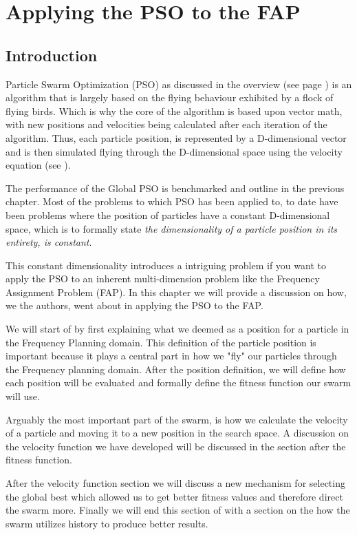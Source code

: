 \chapter{Applying the PSO to the FAP}
\label{chpt:psoapplicationFAP}
\section{Introduction}
Particle Swarm Optimization (PSO) as discussed in the overview (see page \pageref{sec:PSO}) is an algorithm that is largely based on the flying behaviour exhibited by a flock of flying birds. Which is why the core
of the algorithm is based upon vector math, with new positions and velocities being calculated after each iteration of the algorithm. Thus, each particle position, is represented by a D-dimensional vector and
is then simulated flying through the D-dimensional space using the velocity equation (see \pageref{}).

The performance of the Global PSO is benchmarked and outline in the previous chapter. Most of the problems to which PSO has been applied to, to date have been problems where the position of particles have a 
constant D-dimensional space, which is to formally state \emph{the dimensionality of a particle position in its entirety, is constant}.

This constant dimensionality introduces a intriguing problem if you want to apply the PSO to an inherent multi-dimension problem like the Frequency Assignment Problem (FAP). In this chapter we will provide
a discussion on how, we the authors, went about in applying the PSO to the FAP.

We will start of by first explaining what we deemed as a position for a particle in the Frequency Planning domain. This definition of the particle position is important because it plays a central part in
how we "fly" our particles through the Frequency planning domain. After the position definition, we will define how each position will be evaluated and formally define the fitness function our swarm will use.

Arguably the most important part of the swarm, is how we calculate the velocity of a particle and moving it to a new position in the search space. A discussion on the velocity function we have 
developed will be discussed in the section after the fitness function.

After the velocity function section we will discuss a new mechanism for selecting the global best which allowed us to get better fitness values and therefore direct the swarm more. Finally we will end this section
of with a section on the how the swarm utilizes history to produce better results.
